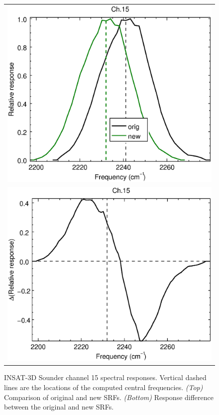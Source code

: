 \begin{figure}[H]
  \centering
  \begin{tabular}{c}
    \includegraphics[scale=0.55]{graphics/sndr/srf/sndr_insat3d-15.eps} \\
    \includegraphics[scale=0.55]{graphics/sndr/srf/sndr_insat3d-15.difference.eps}
  \end{tabular}
  \caption{INSAT-3D Sounder channel 15 spectral responses. Vertical dashed lines are the locations of the computed central frequencies. \emph{(Top)} Comparison of original and new SRFs. \emph{(Bottom)} Response difference between the original and new SRFs.}
  \label{fig:sndr_ch15}
\end{figure}


